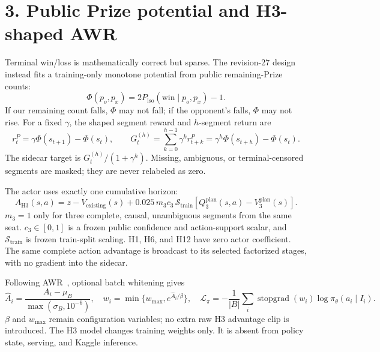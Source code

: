 \section*{3. Public Prize potential and H3-shaped AWR}

Terminal win/loss is mathematically correct but sparse. The revision-27
design~\cite{projectContract2026} instead fits a training-only monotone
potential from public remaining-Prize counts:
\[
 \Phi(p_o,p_x)=2P_{\mathrm{iso}}(\mathrm{win}\mid p_o,p_x)-1 .
\]
If our remaining count falls, $\Phi$ may not fall; if the opponent's falls,
$\Phi$ may not rise. For a fixed $\gamma$, the shaped segment reward and
$h$-segment return are
\[
 r_t^P=\gamma\Phi(s_{t+1})-\Phi(s_t),\qquad
 G_t^{(h)}=\sum_{k=0}^{h-1}\gamma^k r_{t+k}^P
          =\gamma^h\Phi(s_{t+h})-\Phi(s_t).
\]
The sidecar target is $G_t^{(h)}/(1+\gamma^h)$. Missing, ambiguous, or
terminal-censored segments are masked; they are never relabeled as zero.

The actor uses exactly one cumulative horizon:
\[
 A_{\mathrm{H3}}(s,a)=z-V_{\mathrm{existing}}(s)
 +0.025\,m_3c_3\,
 \mathcal S_{\mathrm{train}}\!\left[
 Q^{\mathrm{plan}}_3(s,a)-V^{\mathrm{plan}}_3(s)\right].
\]
$m_3=1$ only for three complete, causal, unambiguous segments from the same
seat. $c_3\in[0,1]$ is a frozen public confidence and action-support scalar,
and
$\mathcal S_{\mathrm{train}}$ is frozen train-split scaling. H1, H6, and H12
have zero actor coefficient. The same complete action advantage is broadcast
to its selected factorized stages, with no gradient into the sidecar.

Following AWR~\cite{peng2019awr}, optional batch whitening gives
\[
 \widehat A_i=\frac{A_i-\mu_B}{\max(\sigma_B,10^{-6})},\quad
 w_i=\min\{w_{\max},e^{\widehat A_i/\beta}\},\quad
 \mathcal L_\pi=-\frac1{|B|}\sum_i
 \operatorname{stopgrad}(w_i)\log\pi_\theta(a_i\mid I_i).
\]
$\beta$ and $w_{\max}$ remain configuration variables; no extra raw H3
advantage clip is introduced. The H3 model changes training weights only. It
is absent from policy state, serving, and Kaggle inference.
